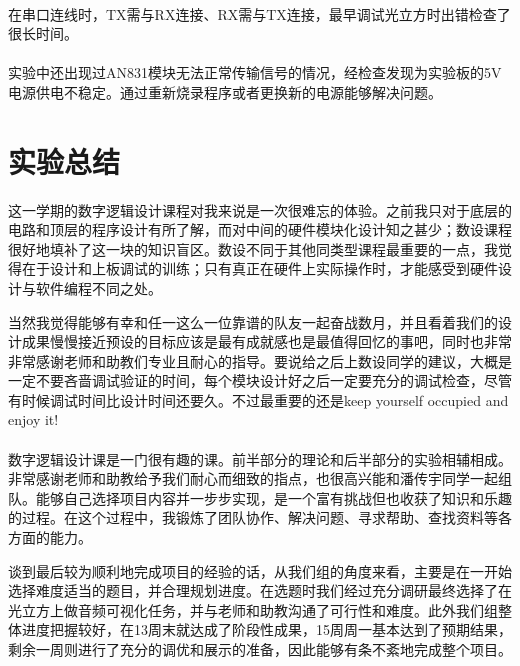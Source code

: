 \documentclass[12pt]{article}
\begin{document}
\paragraph{}在串口连线时，TX需与RX连接、RX需与TX连接，最早调试光立方时出错检查了很长时间。
\paragraph{}实验中还出现过AN831模块无法正常传输信号的情况，经检查发现为实验板的5V电源供电不稳定。通过重新烧录程序或者更换新的电源能够解决问题。

\section{实验总结}
\paragraph{}
这一学期的数字逻辑设计课程对我来说是一次很难忘的体验。之前我只对于底层的电路和顶层的程序设计有所了解，而对中间的硬件模块化设计知之甚少；数设课程很好地填补了这一块的知识盲区。数设不同于其他同类型课程最重要的一点，我觉得在于设计和上板调试的训练；只有真正在硬件上实际操作时，才能感受到硬件设计与软件编程不同之处。

当然我觉得能够有幸和任一这么一位靠谱的队友一起奋战数月，并且看着我们的设计成果慢慢接近预设的目标应该是最有成就感也是最值得回忆的事吧，同时也非常非常感谢老师和助教们专业且耐心的指导。要说给之后上数设同学的建议，大概是一定不要吝啬调试验证的时间，每个模块设计好之后一定要充分的调试检查，尽管有时候调试时间比设计时间还要久。不过最重要的还是keep yourself occupied and enjoy it!


\paragraph{}
数字逻辑设计课是一门很有趣的课。前半部分的理论和后半部分的实验相辅相成。非常感谢老师和助教给予我们耐心而细致的指点，也很高兴能和潘传宇同学一起组队。能够自己选择项目内容并一步步实现，是一个富有挑战但也收获了知识和乐趣的过程。在这个过程中，我锻炼了团队协作、解决问题、寻求帮助、查找资料等各方面的能力。

谈到最后较为顺利地完成项目的经验的话，从我们组的角度来看，主要是在一开始选择难度适当的题目，并合理规划进度。在选题时我们经过充分调研最终选择了在光立方上做音频可视化任务，并与老师和助教沟通了可行性和难度。此外我们组整体进度把握较好，在13周末就达成了阶段性成果，15周周一基本达到了预期结果，剩余一周则进行了充分的调优和展示的准备，因此能够有条不紊地完成整个项目。 

\end{document}
